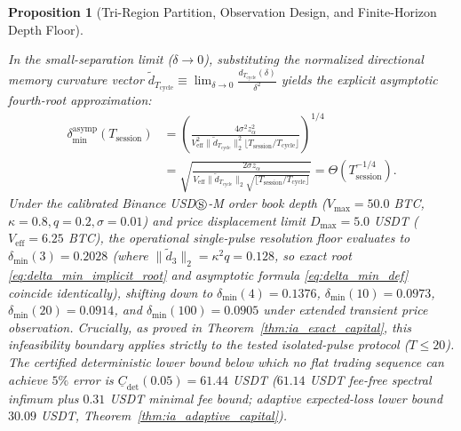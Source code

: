 \documentclass[12pt]{article}
\newtheorem{proposition}[theorem]{Proposition}
\theoremstyle{definition}
\theoremstyle{remark}
\begin{document}
\begin{proposition}[Tri-Region Partition, Observation Design, and Finite-Horizon Depth Floor]
\begin{enumerate}[label=(\roman*)]
\begin{equation}
\label{eq:delta_min_implicit_root}
\end{equation}
In the small-separation limit ($\delta \to 0$), substituting the normalized directional memory curvature vector $\tilde{d}_{T_{\mathrm{cycle}}} \equiv \lim_{\delta \to 0} \frac{d_{T_{\mathrm{cycle}}}(\delta)}{\delta^2}$ yields the explicit asymptotic fourth-root approximation:
\begin{align}
\delta_{\min}^{\mathrm{asymp}}(T_{\mathrm{session}}) &= \left(\frac{4 \sigma^2 z_\alpha^2}{V_{\mathrm{eff}}^2 \|\tilde{d}_{T_{\mathrm{cycle}}}\|_2^2 \lfloor T_{\mathrm{session}} / T_{\mathrm{cycle}} \rfloor}\right)^{1/4} \nonumber \\
&= \sqrt{\frac{2 \sigma z_\alpha}{V_{\mathrm{eff}} \|\tilde{d}_{T_{\mathrm{cycle}}}\|_2 \sqrt{\lfloor T_{\mathrm{session}} / T_{\mathrm{cycle}} \rfloor}}} = \Theta(T_{\mathrm{session}}^{-1/4}).
\label{eq:delta_min_def}
\end{align}
Under the calibrated Binance USD$\circledS$-M order book depth ($V_{\max} = 50.0$ BTC, $\kappa = 0.8, q = 0.2, \sigma = 0.01$) and price displacement limit $D_{\max} = 5.0$ USDT ($V_{\mathrm{eff}} = 6.25$ BTC), the operational single-pulse resolution floor evaluates to $\delta_{\min}(3) = 0.2028$ (where $\|\tilde{d}_3\|_2 = \kappa^2 q = 0.128$, so exact root \eqref{eq:delta_min_implicit_root} and asymptotic formula \eqref{eq:delta_min_def} coincide identically), shifting down to $\delta_{\min}(4) = 0.1376$, $\delta_{\min}(10) = 0.0973$, $\delta_{\min}(20) = 0.0914$, and $\delta_{\min}(100) = 0.0905$ under extended transient price observation. Crucially, as proved in Theorem~\ref{thm:ia_exact_capital}, this infeasibility boundary applies strictly to the tested isolated-pulse protocol ($T \le 20$). The certified deterministic lower bound below which no flat trading sequence can achieve $5\%$ error is $\underline{C}_{\mathrm{det}}(0.05) = 61.44$ USDT ($61.14$ USDT fee-free spectral infimum plus $0.31$ USDT minimal fee bound; adaptive expected-loss lower bound $30.09$ USDT, Theorem~\ref{thm:ia_adaptive_capital}).
\end{enumerate}
\end{proposition}
\end{document}
